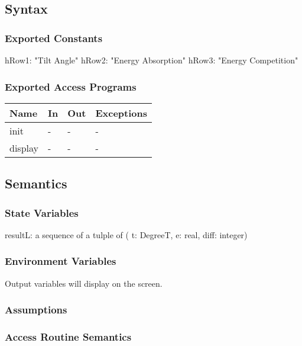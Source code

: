 \documentclass[12pt, titlepage]{article}
\begin{document}
\subsection{Syntax}

\subsubsection{Exported Constants}

hRow1: "Tilt Angle"
hRow2: "Energy Absorption"
hRow3: "Energy Competition"

\subsubsection{Exported Access Programs}

\begin{center}
\begin{tabular}{p{2cm} p{5cm} p{5cm} p{2cm}}
\hline
\textbf{Name} & \textbf{In} & \textbf{Out} & \textbf{Exceptions} \\
\hline 
init & - & - & - \\
display & - & - & - \\

\hline
\end{tabular}
\end{center}


\subsection{Semantics}

\subsubsection{State Variables}

resultL: a sequence of a tulple of ( t: DegreeT, e: real, diff: integer)\\

\subsubsection{Environment Variables}
Output variables will display on the screen.

\subsubsection{Assumptions}


\subsubsection{ Access Routine Semantics}
\end{document}
